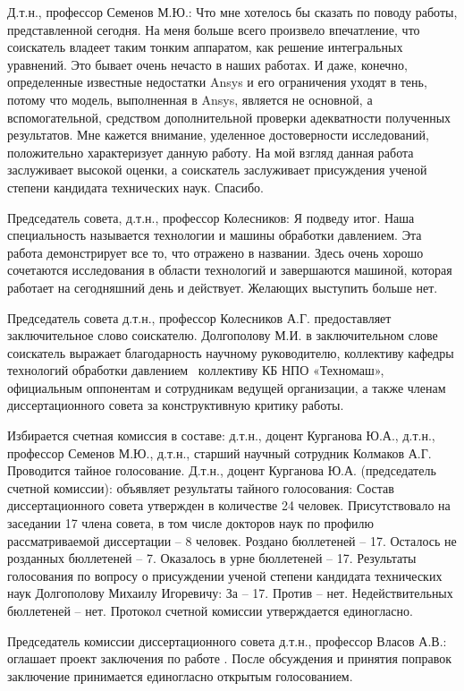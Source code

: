 Д.т.н., профессор Семенов М.Ю.: 
Что мне хотелось бы сказать по поводу работы, представленной сегодня. На меня больше всего произвело впечатление, что соискатель владеет таким тонким аппаратом, как решение интегральных уравнений. Это бывает очень нечасто в наших работах. И даже, конечно, определенные известные недостатки Ansys и его ограничения уходят в тень, потому что модель, выполненная в Ansys, является не основной, а вспомогательной, средством дополнительной проверки адекватности полученных результатов. Мне кажется внимание, уделенное достоверности исследований, положительно характеризует данную работу. На мой взгляд данная работа заслуживает высокой оценки, а соискатель заслуживает присуждения ученой степени кандидата технических наук. Спасибо.

Председатель совета, д.т.н., профессор Колесников: Я подведу итог. Наша специальность называется технологии и машины обработки давлением. Эта работа демонстрирует все то, что отражено в названии. Здесь очень хорошо сочетаются исследования в области технологий и завершаются машиной, которая работает на сегодняшний день и действует. 
Желающих выступить больше нет.

Председатель совета д.т.н., профессор Колесников А.Г. предоставляет заключительное слово соискателю.
Долгополову М.И. в заключительном слове соискатель выражает благодарность научному руководителю, коллективу кафедры технологий обработки давлением \thesisOrganizationShort\, коллективу КБ НПО «Техномаш», официальным оппонентам и сотрудникам ведущей организации, а также членам диссертационного совета за конструктивную критику работы.

Избирается счетная комиссия в составе: д.т.н., доцент Курганова Ю.А., д.т.н., профессор Семенов М.Ю., д.т.н., старший научный сотрудник Колмаков А.Г.
Проводится тайное голосование.
Д.т.н., доцент Курганова Ю.А. (председатель счетной комиссии): объявляет результаты тайного голосования:
Состав диссертационного совета утвержден в количестве 24 человек.
Присутствовало на заседании 17 члена совета, в том числе докторов наук по профилю рассматриваемой диссертации – 8 человек.
Роздано бюллетеней – 17.
Осталось не розданных бюллетеней – 7.
Оказалось в урне бюллетеней – 17.
Результаты голосования по вопросу о присуждении ученой степени кандидата технических наук Долгополову Михаилу Игоревичу:
За – 17.
Против – нет.
Недействительных бюллетеней – нет.
Протокол счетной комиссии утверждается единогласно.

Председатель комиссии диссертационного совета д.т.н., профессор 
Власов А.В.: оглашает проект заключения по работе \thesisAuthorLastNameFrom.
После обсуждения и принятия поправок заключение принимается единогласно открытым голосованием.

\clearpage